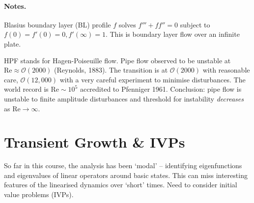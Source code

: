\documentclass{jknotes}
\newcommand{\ReN}{\text{Re}}
\begin{document}
\paragraph{Notes.}
Blasius boundary layer (BL) profile $f$ solves $f''' + ff'' = 0$ subject to
$f(0) = f'(0) = 0, f'(\infty) = 1$. This is boundary layer flow over an
infinite plate. 

HPF stands for Hagen-Poiseuille flow. Pipe flow observed to be unstable at
$\ReN \approx \mathcal{O}(2000)$ (Reynolds, 1883). The transition is at
$\mathcal{O}(2000)$ with reasonable care, $\mathcal{O}(12,000)$ with a very
careful experiment to minimise disturbances. The world record is $\ReN \sim
10^5$ accredited to Pfenniger 1961.  Conclusion: pipe flow is unstable to
finite amplitude disturbances and threshold for instability \emph{decreases} as
$\ReN \to \infty$.

\section{Transient Growth \& IVPs}
So far in this course, the analysis has been `modal' -- identifying
eigenfunctions and eigenvalues of linear operators around basic states. This
can miss interesting features of the linearised dynamics over `short' times.
Need to consider initial value problems (IVPs).
\end{document}
